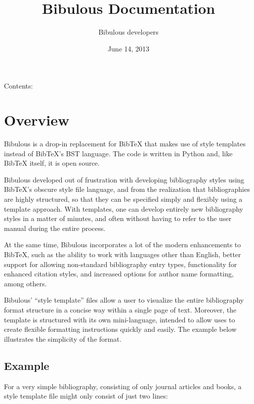 \documentclass[letterpaper,10pt,english]{sphinxmanual}
\title{Bibulous Documentation}
\date{June 14, 2013}
\author{Bibulous developers}
\begin{document}
\maketitle
\tableofcontents
{}\label{index::doc}


Contents:


\chapter{Overview}
\label{README:bibulous-documentation}\label{README:overview}\label{README::doc}
Bibulous is a drop-in replacement for BibTeX that makes use of style templates instead of BibTeX's
BST language. The code is written in Python and, like BibTeX itself, it is open source.

Bibulous developed out of frustration with developing bibliography styles using BibTeX's obscure
style file language, and from the realization that bibliographies are highly structured, so that
they can be specified simply and flexibly using a template approach. With templates, one can
develop entirely new bibliography styles in a matter of minutes, and often without having to refer
to the user manual during the entire process.

At the same time, Bibulous incorporates a lot of the modern enhancements to BibTeX, such as the
ability to work with languages other than English, better support for allowing non-standard
bibliography entry types, functionality for enhanced citation styles, and increased options for
author name formatting, among others.

Bibulous' ``style template'' files allow a user to visualize the entire bibliography format
structure in a concise way within a single page of text. Moreover, the template is structured with
its own mini-language, intended to allow uses to create flexible formatting instructions quickly
and easily. The example below illustrates the simplicity of the format.


\section{Example}
\label{README:example}
For a very simple bibliography, consisting of only journal articles and books, a style template
file might only consist of just two lines:
\end{document}
